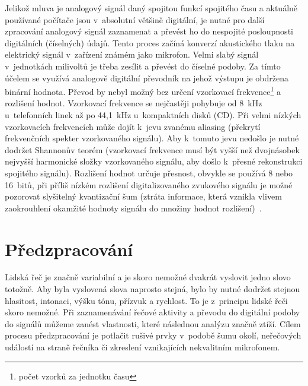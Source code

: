 Jelikož mluva je analogový signál daný spojitou funkcí spojitého času a aktuálně používané počítače jsou v~absolutní většině digitální, je nutné pro další zpracování analogový signál zaznamenat a převést ho do nespojité posloupnosti digitálních (číselných) údajů. Tento proces začíná konverzí akustického tlaku na elektrický signál v~zařízení známém jako mikrofon. Velmi slabý signál v~jednotkách milivoltů je třeba zesílit a převést do číselné podoby. Za tímto účelem se využívá analogově digitální převodník na jehož výstupu je obdržena binární hodnota. Převod by nebyl možný bez určení vzorkovací frekvence\footnote{počet vzorků za jednotku času} a rozlišení hodnot. Vzorkovací frekvence se nejčastěji pohybuje od 8~kHz u~telefonních linek až po 44,1~kHz u~kompaktních disků (CD). Při velmi nízkých vzorkovacích frekvencích může dojít k~jevu zvanému aliasing (překrytí frekvenčních spekter vzorkovaného signálu). Aby k~tomuto jevu nedošlo je nutné dodržet Shannonův teorém (vzorkovací frekvence musí být vyšší než dvojnásobek nejvyšší harmonické složky vzorkovaného signálu, aby došlo k~přesné rekonstrukci spojitého signálu). Rozlišení hodnot určuje přesnost, obvykle se používá 8 nebo 16~bitů, při příliš nízkém rozlišení digitalizovaného zvukového signálu je možné pozorovat slyšitelný kvantizační šum (ztráta informace, která vznikla vlivem zaokrouhlení okamžité hodnoty signálu do množiny hodnot rozlišení)~\cite{Sigmund_Analyza}.




\section{Předzpracování}
Lidská řeč je značně variabilní a je skoro nemožné dvakrát vyslovit jedno slovo totožně. Aby byla vyslovená slova naprosto stejná, bylo by nutné dodržet stejnou hlasitost, intonaci, výšku tónu, přízvuk a rychlost. To je z~principu lidské řeči skoro nemožné. Při zaznamenávání řečové aktivity a převodu do digitální podoby do signálů můžeme zanést vlastnosti, které následnou analýzu značně ztíží. Cílem procesu předzpracování je potlačit rušivé prvky v~podobě
šumu okolí, neřečových událostí na straně řečníka či zkreslení vznikajících nekvalitním mikrofonem.


